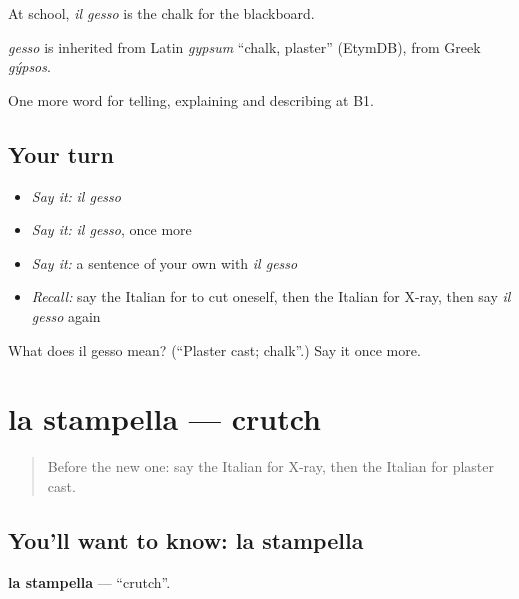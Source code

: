 At school, \emph{il gesso} is the chalk for the blackboard.

\begin{cousinweb}
\emph{gesso} is inherited from Latin \emph{gypsum} \textquotedblleft{}chalk, plaster\textquotedblright{} (EtymDB), from Greek \emph{gýpsos}.
\end{cousinweb}

\begin{grammarlens}[title={What you've built}]
One more word for telling, explaining and describing at B1.
\end{grammarlens}

\subsection*{Your turn}
\begin{itemize}
\raggedright
  \item \emph{Say it:} \emph{il gesso}
  \item \emph{Say it:} \emph{il gesso}, once more
  \item \emph{Say it:} a sentence of your own with \emph{il gesso}
  \item \emph{Recall:} say the Italian for to cut oneself, then the Italian for X-ray, then say \emph{il gesso} again
\end{itemize}

\begin{tcolorbox}[breakable,colback=teal!4,colframe=teal!35!black,title={Before you move on}]
What does il gesso mean? (\textquotedblleft{}Plaster cast; chalk\textquotedblright{}.) Say it once more.
\end{tcolorbox}
\section[la stampella]{la stampella — crutch}

\label{lesson:IT-C484-stampella}



\begin{quote}
Before the new one: say the Italian for X-ray, then the Italian for plaster cast.
\end{quote}

\subsection*{You'll want to know: la stampella}
\textbf{la stampella} — \textquotedblleft{}crutch\textquotedblright{}.

